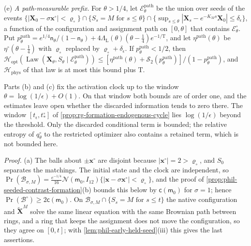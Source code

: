 (e) \emph{A path-measurable prefix.} For \(\theta>1/4\), let
\(\mathscr E^{\mathrm{path}}_\theta\) be the union over seeds of the events
\(\{|\mathbf X_0-\sigma\mathbf x^\circ|<\varrho_\circ\}\cap\{S_s=M\text{ for }s\le\theta\}
\cap\{\sup_{s\le\theta}|\mathbf X_s-e^{-K_Ms}\mathbf X_0|\le\delta_\epsilon\}\),
a function of the configuration and assignment path on \([0,\theta]\) that
contains \(\mathscr E^\circ_\theta\). Put
\(p^{\mathrm{path}}_\theta=e^{1/4}\mathsf n_\theta/(1-\mathsf n_\theta)
+4\Lambda_{\mathrm L}(\theta)(\theta-\frac14)e^{-1/\mathrm T}\), and let
\(\eta^{\mathrm{path}}(\theta)\) be \(\eta^\circ(\theta-\frac14)\) with
\(\varrho_\circ\) replaced by \(\varrho_\circ+\delta_\epsilon\). If
\(p^{\mathrm{path}}_\theta<1/2\), then
\(\mathcal H_{\mathrm{opt}}(\operatorname{Law}(\mathbf X_\theta,S_\theta\mid
\mathscr E^{\mathrm{path}}_\theta))\le
[\eta^{\mathrm{path}}(\theta)+\mathcal S_2(p^{\mathrm{path}}_\theta)]
/(1-p^{\mathrm{path}}_\theta)\), and \(\mathcal H_{\mathrm{phys}}\) of that
law is at most this bound plus \(\mathrm T\).

Parts (b) and (c) fix the activation clock up to the window
\(\theta=\log(1/\epsilon)+O(1)\). On that window both bounds are of order one,
and the estimates leave open whether the discarded information tends to zero
there. The window \([t_\epsilon,t^\circ_*]\) of
\cref{prop:rg-formation-endogenous-cycle} lies \(\log(1/\epsilon)\) beyond the
threshold. Only the discarded conditional term is bounded; the relative entropy
of \(q^\circ_\theta\) to the restricted optimizer also contains a retained
term, which is not bounded here.

\noindent\emph{Proof.}
(a) The balls about \(\pm\mathbf x^\circ\) are disjoint because
\(|\mathbf x^\circ|=2>\varrho_\circ\), and \(S_0\) separates the matchings.
The initial state and the clock are independent, so
\(\Pr(\mathscr B_{\sigma,M})=\frac{e^{-1/4}}{16}\mathcal N(\mathsf m_0,I_{12})
\{|\mathbf x-\sigma\mathbf x^\circ|<\varrho_\circ\}\), and the proof of
\cref{prop:phil-seeded-contrast-formation}(b) bounds this below by
\(\mathsf c(\mathsf m_0)\) for \(\sigma=1\); hence
\(\Pr(\mathscr B^\circ)\ge2\mathsf c(\mathsf m_0)\). On
\(\mathscr B_{\sigma,M}\cap\{S_s=M\text{ for }s\le t\}\) the native configuration and
\(\widetilde{\mathbf X}^M\) solve the same linear equation with the same
Brownian path between rings, and a ring that keeps the assignment does not
move the configuration, so they agree on \([0,t]\); with
\cref{lem:phil-early-held-seed}(iii) this gives the last assertions.

